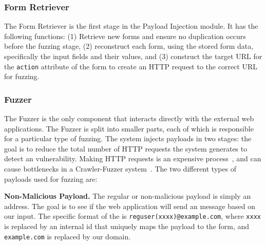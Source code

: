

\subsubsection{\Email Form Retriever}
\label{Comp:EMFR}
The \Email Form Retriever is the first stage in the Payload Injection
module. It has the following functions: (1) Retrieve new forms and
ensure no duplication occurs before the fuzzing stage, (2) reconstruct
each form, using the stored form data, specifically the input fields
and their values, and (3) construct the target URL for the
\texttt{action} attribute of the form to create an HTTP request to the
correct URL for fuzzing.


\subsubsection{Fuzzer}
\label{Comp:Fuzzer}
The Fuzzer is the only component that interacts directly with the external web applications. The Fuzzer is split into smaller parts, each of which is responsible for a particular type of fuzzing.  The system injects payloads in two stages: the goal is to reduce the total number of HTTP requests the system generates to detect an \ehi vulnerability. Making HTTP requests is an expensive process~\cite{httpperf}, and can cause bottlenecks in a Crawler-Fuzzer system~\cite{ShkapenyukTorstenSuel2001}.
The two different types of payloads used for fuzzing are:

\noindent\textbf{Non-Malicious Payload.}
The regular or non-malicious payload is simply an \email address. The goal is to see if the web application will send an \email message based on our input. The specific format of the \email is \lstinline|reguser(xxxx)@example.com|, where \texttt{xxxx} is replaced by an internal id that uniquely maps the payload to the form, and \texttt{example.com} is replaced by our domain.

